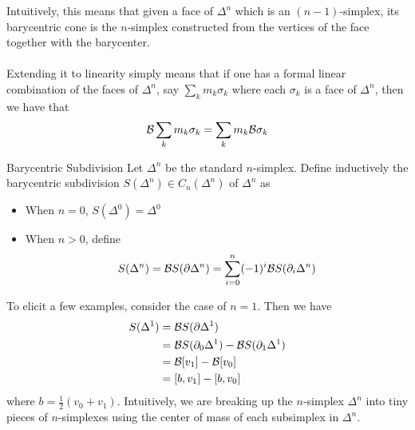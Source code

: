 \documentclass[a4paper]{article}
\begin{document}
Intuitively, this means that given a face of $\Delta^n$ which is an $(n-1)$-simplex, its barycentric cone is the $n$-simplex constructed from the vertices of the face together with the barycenter. \\~\\

Extending it to linearity simply means that if one has a formal linear combination of the faces of $\Delta^n$, say $\sum_{k}m_k\sigma_k$ where each $\sigma_k$ is a face of $\Delta^n$, then we have that $$\mathcal{B}\sum_km_k\sigma_k=\sum_km_k\mathcal{B}\sigma_k$$

\begin{defn}{Barycentric Subdivision}{} Let $\Delta^n$ be the standard $n$-simplex. Define inductively the barycentric subdivision $S(\Delta^n)\in C_n(\Delta^n)$ of $\Delta^n$ as
\begin{itemize}
\item When $n=0$, $S(\Delta^0)=\Delta^0$
\item When $n>0$, define $$S(\Delta^n)=\mathcal{B} S(\partial\Delta^n)=\sum_{i=0}^n(-1)^i\mathcal{B} S(\partial_i\Delta^n)$$
\end{itemize}
\end{defn}

To elicit a few examples, consider the case of $n=1$. Then we have 
\begin{align*}
S(\Delta^1)&=\mathcal{B} S(\partial\Delta^1)\\
&=\mathcal{B} S(\partial_0\Delta^1)-\mathcal{B} S(\partial_1\Delta^1)\\
&=\mathcal{B}[v_1]-\mathcal{B}[v_0]\\
&=[b,v_1]-[b,v_0]
\end{align*}
where $b=\frac{1}{2}(v_0+v_1)$. Intuitively, we are breaking up the $n$-simplex $\Delta^n$ into tiny pieces of $n$-simplexes using the center of mass of each subsimplex in $\Delta^n$. 
\end{document}
